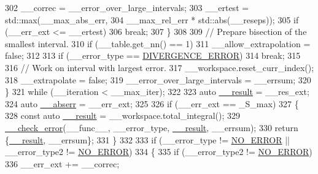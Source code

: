 \begin{DoxyCode}
302               \_\_correc = \_\_error\_over\_large\_intervals;
303               \_\_ertest = std::max(\_\_max\_abs\_err,
304                                   \_\_max\_rel\_err * std::abs(\_\_reseps));
305               \textcolor{keywordflow}{if} (\_\_err\_ext <= \_\_ertest)
306                 \textcolor{keywordflow}{break};
307             \}
308 
309           \textcolor{comment}{// Prepare bisection of the smallest interval.}
310           \textcolor{keywordflow}{if} (\_\_table.get\_nn() == 1)
311             \_\_allow\_extrapolation = \textcolor{keyword}{false};
312 
313           \textcolor{keywordflow}{if} (\_\_error\_type == \hyperlink{namespace____gnu__cxx_ad6c62dd86a596716cece6ac2d4cfd4b3a5a36b63b8fa7c921d9332c69416c2686}{DIVERGENCE\_ERROR})
314             \textcolor{keywordflow}{break};
315 
316           \textcolor{comment}{// Work on interval with largest error.}
317           \_\_workspace.reset\_curr\_index();
318           \_\_extrapolate = \textcolor{keyword}{false};
319           \_\_error\_over\_large\_intervals = \_\_errsum;
320         \}
321       \textcolor{keywordflow}{while} (\_\_iteration < \_\_max\_iter);
322 
323       \textcolor{keyword}{auto} \hyperlink{namespace____gnu__cxx_a500ea9f53aeaecd8c2ae657503450578}{\_\_result} = \_\_res\_ext;
324       \textcolor{keyword}{auto} \hyperlink{namespace____gnu__cxx_a72f736cff127f1574e91a301de9e074b}{\_\_abserr} = \_\_err\_ext;
325 
326       \textcolor{keywordflow}{if} (\_\_err\_ext == \_S\_max)
327         \{
328           \textcolor{keyword}{const} \textcolor{keyword}{auto} \hyperlink{namespace____gnu__cxx_a500ea9f53aeaecd8c2ae657503450578}{\_\_result} = \_\_workspace.total\_integral();
329           \hyperlink{namespace____gnu__cxx_a370fd142548c2e9e39e69282b4603317}{\_\_check\_error}(\_\_func\_\_, \_\_error\_type, \hyperlink{namespace____gnu__cxx_a500ea9f53aeaecd8c2ae657503450578}{\_\_result}, \_\_errsum);
330           \textcolor{keywordflow}{return} \{\hyperlink{namespace____gnu__cxx_a500ea9f53aeaecd8c2ae657503450578}{\_\_result}, \_\_errsum\};
331         \}
332 
333       \textcolor{keywordflow}{if} (\_\_error\_type != \hyperlink{namespace____gnu__cxx_ad6c62dd86a596716cece6ac2d4cfd4b3ac31eecc280b10dec2efb4a2216ccc2e0}{NO\_ERROR} || \_\_error\_type2 != \hyperlink{namespace____gnu__cxx_ad6c62dd86a596716cece6ac2d4cfd4b3ac31eecc280b10dec2efb4a2216ccc2e0}{NO\_ERROR})
334         \{
335           \textcolor{keywordflow}{if} (\_\_error\_type2 != \hyperlink{namespace____gnu__cxx_ad6c62dd86a596716cece6ac2d4cfd4b3ac31eecc280b10dec2efb4a2216ccc2e0}{NO\_ERROR})
336             \_\_err\_ext += \_\_correc;

\end{DoxyCode}
